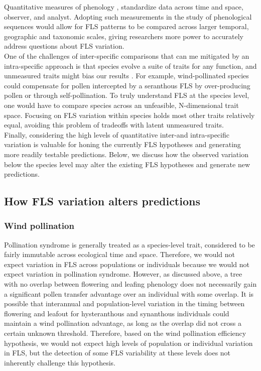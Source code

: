 \documentclass{article}
\begin{document}
Quantitative measures of phenology \citep[e.g. the BBCH scale,][]{Finn2007}, standardize data across time and space, observer, and analyst. Adopting such measurements in the study of phenological sequences would allow for FLS patterns to be compared across larger temporal, geographic and taxonomic scales, giving researchers more power to accurately address questions about FLS variation.\\
 
One of the challenges of inter-specific comparisons that can me mitigated by an intra-specific approach is that species evolve a suite of traits for any function, and unmeasured traits might bias our results \citep{Davies2019}. For example, wind-pollinated species could compensate for pollen intercepted by a seranthous FLS by over-producing pollen or through self-pollination. To truly understand FLS at the species level, one would have to compare species across an unfeasible, N-dimensional trait space. Focusing on FLS variation within species holds most other traits relatively equal, avoiding this problem of tradeoffs with latent unmeasured traits.\\

Finally, considering the high levels of quantitative inter-and intra-specific variation is valuable for honing the currently FLS hypotheses and generating more readily testable predictions. Below, we discuss how the observed variation below the species level may alter the existing FLS hypotheses and generate new predictions.
\subsection*{How FLS variation alters predictions}
\subsubsection*{Wind pollination} 
\indent\indent  Pollination syndrome is generally treated as a species-level trait, considered to be fairly immutable across ecological time and space. Therefore, we would not expect variation in FLS across populations or individuals because we would not expect variation in pollination syndrome. However, as discussed above, a tree with no overlap between flowering and leafing phenology does not necessarily gain a significant pollen transfer advantage over an individual with some overlap. It is possible that interannual and population-level variation in the timing between flowering and leafout for hysteranthous and synanthous individuals could maintain a wind pollination advantage, as long as the overlap did not cross a certain unknown threshold. Therefore, based on the wind pollination efficiency hypothesis, we would not expect high levels of population or individual variation in FLS, but the detection of some FLS variability at these levels does not inherently challenge this hypothesis.
\end{document}

